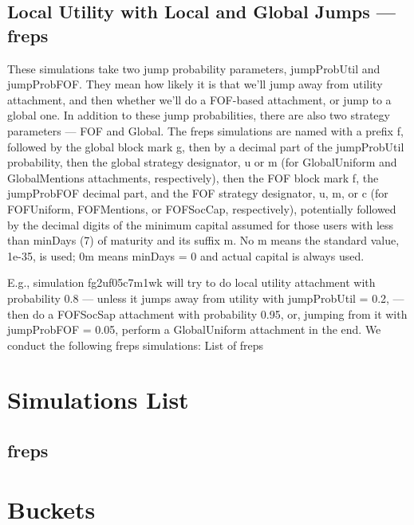 \documentclass[10pt,oneside]{memoir}
\begin{document}
\subsection{Local Utility with Local and Global Jumps --- freps}
\label{localutilitywithlocalandglobaljumpsfreps}

These simulations take two jump probability parameters, jumpProbUtil and jumpProbFOF.  They mean how likely it is that we'll jump away from utility attachment, and then whether we'll do a FOF-based attachment, or jump to a global one.  In addition to these jump probabilities, there are also two strategy parameters --- FOF and Global.
The freps simulations are named with a prefix f, followed by the global block mark g, then by a decimal part of the jumpProbUtil probability, then the global strategy designator, u or m (for GlobalUniform and GlobalMentions attachments, respectively), then the FOF block mark f, the jumpProbFOF decimal part, and the FOF strategy designator, u, m, or c (for FOFUniform, FOFMentions, or FOFSocCap, respectively), potentially followed by the decimal digits of the minimum capital assumed for those users with less than minDays (7) of maturity and its suffix m.  No m means the standard value, 1e-35, is used; 0m means minDays = 0 and actual capital is always used.


E.g., simulation
fg2uf05c7m1wk  will try to do local utility attachment with probability 0.8 --- unless it jumps away from utility with jumpProbUtil = 0.2, --- then do a FOFSocSap attachment with probability 0.95, or, jumping from it with jumpProbFOF = 0.05, perform a GlobalUniform attachment in the end.
We conduct the following freps simulations:
List of freps


\pagebreak \section{Simulations List}
\label{simulationslist}

\subsection{freps}
\label{freps}

\section{Buckets}
\label{buckets}
\end{document}
